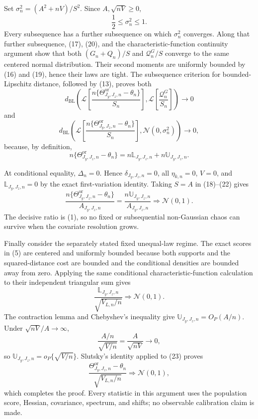 Set \(\sigma_n^2=(A^2+nV)/S^2\). Since \(A,\sqrt{nV}\ge0\),
\[
\frac12\le\sigma_n^2\le1. \tag{21}
\]
Every subsequence has a further subsequence on which \(\sigma_n^2\) converges. Along that further subsequence, (17), (20), and the characteristic-function continuity argument show that both \((G_n+Q_n)/S\) and \(\mathcal Q_n^G/S\) converge to the same centered normal distribution. Their second moments are uniformly bounded by (16) and (19), hence their laws are tight. The subsequence criterion for bounded-Lipschitz distance, followed by (13), proves both
\[
d_{\mathrm{BL}}\!\left(
\mathcal L\left[\frac{n\{\Theta^{\mathrm{or}}_{J_y,J_z,n}-\theta_n\}}{S_n}\right],
\mathcal L\left[\frac{\mathcal Q_n^G}{S_n}\right]\right)\to0
\]
and
\[
d_{\mathrm{BL}}\!\left(
\mathcal L\left[\frac{n\{\Theta^{\mathrm{or}}_{J_y,J_z,n}-\theta_n\}}{S_n}\right],
\mathcal N(0,\sigma_n^2)\right)\to0, \tag{22}
\]
because, by definition,
\[
n\{\Theta^{\mathrm{or}}_{J_y,J_z,n}-\theta_n\}
=n\mathbb L_{J_y,J_z,n}+n\mathbb U_{J_y,J_z,n}. \tag{23}
\]

At conditional equality, \(\Delta_n=0\). Hence \(\delta_{J_y,J_z,n}=0\), all \(\eta_{k,n}=0\), \(V=0\), and \(\mathbb L_{J_y,J_z,n}=0\) by the exact first-variation identity. Taking \(S=A\) in (18)--(22) gives
\[
\frac{n\{\Theta^{\mathrm{or}}_{J_y,J_z,n}-\theta_n\}}{A_{J_y,J_z,n}}
=\frac{n\mathbb U_{J_y,J_z,n}}{A_{J_y,J_z,n}}
\Rightarrow\mathcal N(0,1).
\]
The decisive ratio is (1), so no fixed or subsequential non-Gaussian chaos can survive when the covariate resolution grows.

Finally consider the separately stated fixed unequal-law regime. The exact scores in (5) are centered and uniformly bounded because both supports and the squared-distance cost are bounded and the conditional densities are bounded away from zero. Applying the same conditional characteristic-function calculation to their independent triangular sum gives
\[
\frac{\mathbb L_{J_y,J_z,n}}{\sqrt{V_{L,n}/n}}\Rightarrow\mathcal N(0,1).
\]
The contraction lemma and Chebyshev's inequality give \(\mathbb U_{J_y,J_z,n}=O_P(A/n)\). Under \(\sqrt{nV}/A\to\infty\),
\[
\frac{A/n}{\sqrt{V/n}}=\frac{A}{\sqrt{nV}}\longrightarrow0,
\]
so \(\mathbb U_{J_y,J_z,n}=o_P\{\sqrt{V/n}\}\). Slutsky's identity applied to (23) proves
\[
\frac{\Theta^{\mathrm{or}}_{J_y,J_z,n}-\theta_n}{\sqrt{V_{L,n}/n}}
\Rightarrow\mathcal N(0,1),
\]
which completes the proof. Every statistic in this argument uses the population score, Hessian, covariance, spectrum, and shifts; no observable calibration claim is made.